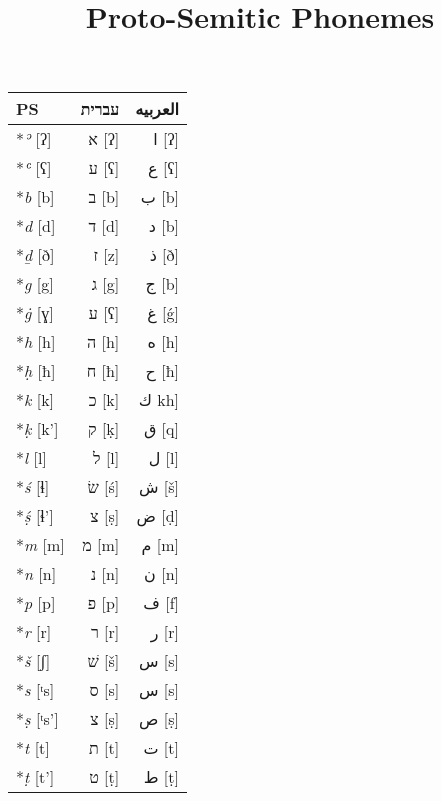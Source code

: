 \documentclass[border=0.25in]{standalone}
\begin{document}
\title{Proto-Semitic Phonemes}
\begin{tabular}{@{}lrr@{}}
  \toprule
  PS              & \texthebrew{עברית} & \textarabic{العربيه} \\
  \midrule
  \**\textit{ʾ} [ʔ]   & \texthebrew{א} [ʔ] & \textarabic{ا} [ʔ] \\
  \**\textit{ʿ} [ʕ]   & \texthebrew{ע} [ʕ] & \textarabic{ع} [ʕ] \\
  \**\textit{b} [b]   & \texthebrew{ב} [b] & \textarabic{ب} [b] \\
  \**\textit{d} [d]   & \texthebrew{ד} [d] & \textarabic{د} [b] \\
  \**\textit{ḏ} [ð]   & \texthebrew{ז} [z] & \textarabic{ذ} [ð] \\
  \**\textit{g} [g]   & \texthebrew{ג} [g] & \textarabic{ج} [b] \\
  \**\textit{ġ} [ɣ]   & \texthebrew{ע} [ʕ] & \textarabic{غ} [\'{g}] \\
  \**\textit{h} [h]   & \texthebrew{ה} [h] & \textarabic{ه} [h] \\ 
  \**\textit{ḥ} [ħ]   & \texthebrew{ח} [ħ] & \textarabic{ح} [ħ] \\
  \**\textit{k} [k]   & \texthebrew{כ} [k] & \textarabic{ك} kh] \\
  \**\textit{ḳ} [k']  & \texthebrew{ק} [ḳ] & \textarabic{ق} [q]\\
  \**\textit{l} [l]   & \texthebrew{ל} [l] & \textarabic{ل} [l]\\
  \**\textit{ś} [ɬ]   & \texthebrew{שׂ} [ś] & \textarabic{ش} [š]\\
  \**\textit{ṣ́} [ɬ']  & \texthebrew{צ} [ṣ] & \textarabic{ض} [ḍ]\\
  \**\textit{m} [m]   & \texthebrew{מ} [m] & \textarabic{م} [m]\\
  \**\textit{n} [n]   & \texthebrew{נ} [n] & \textarabic{ن} [n]\\
  \**\textit{p} [p]   & \texthebrew{פ} [p] & \textarabic{ف} [f]\\
  \**\textit{r} [r]   & \texthebrew{ר} [r] & \textarabic{ر} [r]\\
  \**\textit{š} [ʃ]   & \texthebrew{שׁ} [š] & \textarabic{س} [s]\\
  \**\textit{s} [ᵗs]  & \texthebrew{ס} [s] & \textarabic{س} [s]\\
  \**\textit{ṣ} [ᵗs'] & \texthebrew{צ} [ṣ] & \textarabic{ص} [ṣ]\\
  \**\textit{t} [t]   & \texthebrew{ת} [t] & \textarabic{ت} [t]\\
  \**\textit{ṭ} [t']  & \texthebrew{ט} [ṭ] & \textarabic{ط} [ṭ]\\

\end{tabular}
\end{document}
